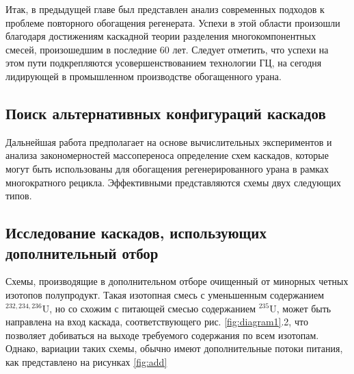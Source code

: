 Итак, в предыдущей главе был представлен анализ современных подходов к проблеме повторного обогащения регенерата.
Успехи в этой области произошли благодаря достижениям каскадной теории разделения многокомпонентных смесей, произошедшим в последние 60 лет.
Следует отметить, что успехи на этом пути подкрепляются усовершенствованием технологии ГЦ, на сегодня лидирующей в промышленном производстве обогащенного урана.

\subsection{Поиск альтернативных конфигураций каскадов}
Дальнейшая работа предполагает на основе вычислительных экспериментов и анализа закономерностей массопереноса определение схем каскадов, которые могут быть использованы для обогащения регенерированного урана в рамках многократного рецикла.
Эффективными представляются схемы двух следующих типов.

\subsection{Исследование каскадов, использующих дополнительный отбор}
Схемы, производящие в дополнительном отборе очищенный от минорных четных изотопов полупродукт. Такая изотопная смесь с уменьшенным содержанием $^{232,234,236}$U, но со схожим с питающей смесью содержанием $^{235}$U, может быть направлена на вход каскада, соответствующего рис. \ref{fig:diagram1}.2, что позволяет добиваться на выходе требуемого содержания по всем изотопам. Однако, вариации таких схемы, обычно имеют дополнительные потоки питания, как представлено на рисунках \ref{fig:add}

